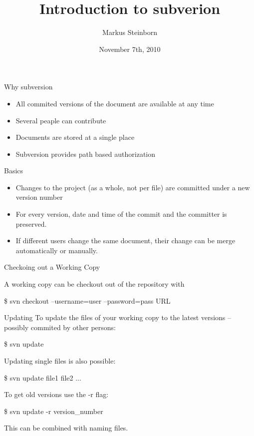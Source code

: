\documentclass{beamer}
\title{Introduction to subverion}
\author{Markus Steinborn}
\date{November 7th, 2010}
\begin{document}
\begin{frame}
\titlepage
\end{frame}


\begin{frame}{Why subversion}
   \begin{itemize}
      \item All commited versions of the document are available at any time
      \item Several peaple can contribute
      \item Documents are stored at a single place
      \item Subversion provides path based authorization
   \end{itemize}
\end{frame}

\begin{frame}{Basics}
   \begin{itemize}
      \item Changes to the project (as a whole, not per file) are committed under a new version number
      \item For every version, date and time of the commit and the committer is preserved.
      \item If different users change the same document, their change can be merge automatically or manually.
   \end{itemize}
\end{frame}


\begin{frame}{Checkoing out a Working Copy}

A working copy can be checkout out of the repository with\medskip

   \$ svn checkout --username=user --password=pass URL

\end{frame}



\begin{frame}{Updating}
  To update the files of your working copy to the latest versions -- possibly commited by other persons:\medskip
  
  \$ svn update\bigskip
  
  Updating single files is also possible:\medskip
  
  \$ svn update file1 file2 ...\bigskip
  
  To get old versions use the -r flag:\medskip
  
  \$ svn update -r version\_number\medskip
  
  This can be combined with naming files.
\end{frame}
\end{document}
